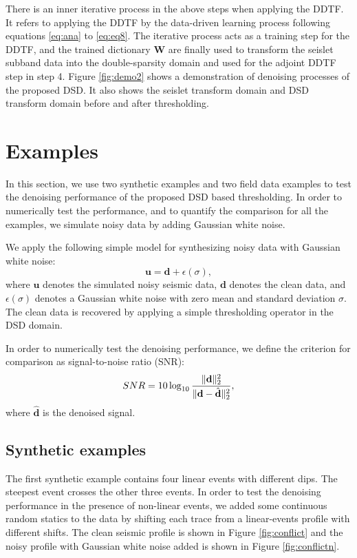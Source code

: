 There is an inner iterative process in the above steps when applying the DDTF. It refers to applying the DDTF by the data-driven learning process following equations \ref{eq:ana} to \ref{eq:eq8}. The iterative process acts as a training step for the DDTF, and the trained dictionary $\mathbf{W}$ are finally used to transform the seislet subband data into the double-sparsity domain and used for the adjoint DDTF step in step 4. Figure \ref{fig:demo2} shows a demonstration of denoising processes of the proposed DSD. It also shows the seislet transform domain and DSD transform domain before and after thresholding. 




\section{Examples}
In this section, we use two synthetic examples and two field data examples to test the denoising performance of 
the proposed DSD based thresholding. In order to numerically test the performance, and to quantify the 
comparison for all the examples, we simulate noisy data by adding Gaussian white noise.


We apply the following simple model for synthesizing noisy data with Gaussian white noise:
\begin{equation}
\label{eq:eq9}
\mathbf{u} = \mathbf{d} + \epsilon(\sigma),
\end{equation}
where $\mathbf{u}$ denotes the simulated noisy seismic data, $\mathbf{d}$ denotes the clean data, and $\epsilon(\sigma)$ denotes a Gaussian white noise with zero mean and standard deviation $\sigma$. The clean data is recovered by applying a simple thresholding operator in the DSD domain.

In order to numerically test the denoising performance, we define the criterion for comparison as signal-to-noise ratio (SNR):
\begin{equation}
\label{eq:diff}
SNR=10\log_{10}\frac{\Arrowvert \mathbf{d} \Arrowvert_2^2}{\Arrowvert \mathbf{d}-\hat{\mathbf{d}}\Arrowvert_2^2},
\end{equation}
where %
$\hat{\mathbf{d}}$ is the denoised signal.

\subsection{Synthetic examples}
The first synthetic example contains four linear events with different dips. The steepest event crosses the other three events. In order to test the denoising performance in  the presence of non-linear events, we added some continuous random statics to the data by shifting each trace from a linear-events profile with different shifts. The clean seismic profile is shown in Figure \ref{fig:conflict} and the noisy profile with Gaussian white noise added is shown in Figure \ref{fig:conflictn}.

